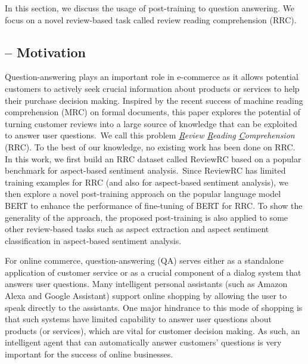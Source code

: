 In this section, we discuss the usage of post-training to question answering.
We focus on a novel review-based task called review reading comprehension (RRC).

\subsection{-- Motivation}
\label{chap6:sec:rrc}

Question-answering plays an important role in e-commerce as it allows potential customers to actively seek crucial information about products or services to help their purchase decision making. 
Inspired by the recent success of machine reading comprehension (MRC) on formal documents, this paper explores the potential of turning customer reviews into a large source of knowledge that can be exploited to answer user questions.~We call this problem \textit{\underline{R}eview \underline{R}eading \underline{C}omprehension} (RRC). To the best of our knowledge, no existing work has been done on RRC. In this work, we first build an RRC dataset called ReviewRC based on a popular benchmark for aspect-based sentiment analysis.~Since ReviewRC has limited training examples for RRC (and also for aspect-based sentiment analysis), we then explore a novel post-training approach on the popular language model BERT to enhance the performance of fine-tuning of BERT for RRC.
To show the generality of the approach, the proposed post-training is also applied to some other review-based tasks such as aspect extraction and aspect sentiment classification in aspect-based sentiment analysis. 

For online commerce, question-answering (QA) serves either as a standalone application of customer service or as a crucial component of a dialog system that answers user questions.
Many intelligent personal assistants (such as Amazon Alexa and Google Assistant) support online shopping by allowing the user to speak directly to the assistants. 
One major hindrance to this mode of shopping is that such systems have limited capability to answer user questions about products (or services), which are vital for customer decision making.
As such, an intelligent agent that can automatically answer customers' questions is very important for the success of online businesses.

